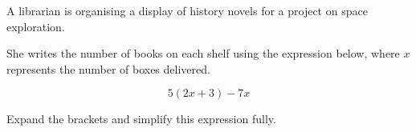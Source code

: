 \begin{question}
\noindent A librarian is organising a display of history novels for a project on space exploration.

She writes the number of books on each shelf using the expression below, where $x$ represents the number of boxes delivered.

\[
5(2x + 3) - 7x
\]

\noindent Expand the brackets and simplify this expression fully.
\vspace{4cm}
\end{question}